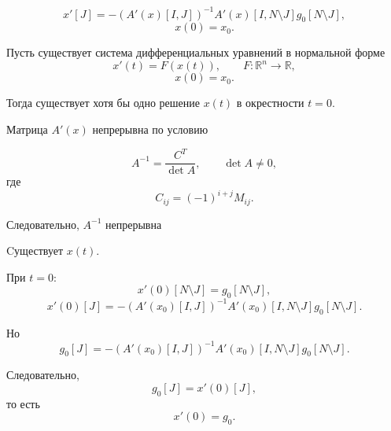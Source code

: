 \documentclass[12pt,a4paper]{article}
\begin{document}
\[
x'[J]
=
-
\left(
A'(x)[I,J]
\right)^{-1}
A'(x)[I,N\setminus J]
g_0[N\setminus J],
\]
\[
x(0)=x_0.
\]

\begin{theorem}{}
Пусть существует система дифференциальных уравнений в нормальной форме
\[
x'(t)=F(x(t)),
\qquad
F:\mathbb{R}^n\to\mathbb{R},
\]
\[
x(0)=x_0.
\]

Тогда существует хотя бы одно решение $x(t)$ в окрестности $t=0$.

Матрица $A'(x)$ непрерывна по условию

\[
A^{-1}
=
\frac{C^T}{\det A},
\qquad
\det A\neq0,
\]
где
\[
C_{ij}=(-1)^{i+j}M_{ij}.
\]

Следовательно, $A^{-1}$ непрерывна
\end{theorem}

\begin{corollary}
Cуществует $x(t)$.

При $t=0$:
\[
x'(0)[N\setminus J]=g_0[N\setminus J],
\]
\[
x'(0)[J]
=
-
\left(
A'(x_0)[I,J]
\right)^{-1}
A'(x_0)[I,N\setminus J]
g_0[N\setminus J].
\]

Но
\[
g_0[J]
=
-
\left(
A'(x_0)[I,J]
\right)^{-1}
A'(x_0)[I,N\setminus J]
g_0[N\setminus J].
\]

Следовательно,
\[
g_0[J]=x'(0)[J],
\]
то есть
\[
x'(0)=g_0.
\]

\end{corollary}
\end{document}
